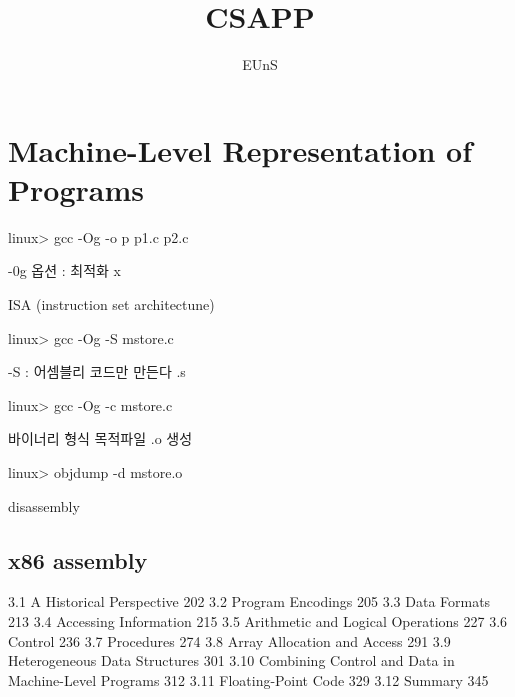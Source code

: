 \documentclass[chapter,oneside]{oblivoir}
\begin{document}
    
    \title{CSAPP}
    \author{ EUnS }

    \maketitle

    \tableofcontents

    


\chapter{Machine-Level Representation of Programs}


linux> gcc -Og -o p p1.c p2.c


-0g 옵션 : 최적화 x

ISA (instruction set architectune)

linux> gcc -Og -S mstore.c

-S : 어셈블리 코드만 만든다 .s

linux> gcc -Og -c mstore.c

바이너리 형식 목적파일 .o  생성


linux> objdump -d mstore.o

disassembly


\section{x86 assembly}











3.1 A Historical Perspective 202
3.2 Program Encodings 205
3.3 Data Formats 213
3.4 Accessing Information 215
3.5 Arithmetic and Logical Operations 227
3.6 Control 236
3.7 Procedures 274
3.8 Array Allocation and Access 291
3.9 Heterogeneous Data Structures 301
3.10 Combining Control and Data in Machine-Level Programs 312
3.11 Floating-Point Code 329
3.12 Summary 345
\end{document}
